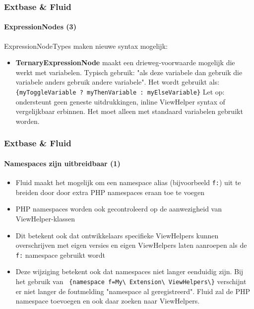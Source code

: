 \begin{frame}[fragile]
	\frametitle{Extbase \& Fluid}
	\framesubtitle{ExpressionNodes (3)}

	ExpressionNodeTypes maken nieuwe syntax mogelijk:

	\begin{itemize}

		\item \textbf{TernaryExpressionNode}\newline
			\small
				maakt een drieweg-voorwaarde mogelijk die werkt met variabelen.
				Typisch gebruik: "als deze variabele dan gebruik die variabele anders gebruik
				andere variabele". Het wordt gebruikt als:\newline
				\texttt{\{myToggleVariable ? myThenVariable : myElseVariable\}}\newline
				Let op: ondersteunt geen geneste uitdrukkingen, inline ViewHelper
				syntax of vergelijkbaar erbinnen. Het moet alleen met standaard variabelen
				gebruikt worden.
			\normalsize

	\end{itemize}

\end{frame}


\begin{frame}[fragile]
	\frametitle{Extbase \& Fluid}
	\framesubtitle{Namespaces zijn uitbreidbaar (1)}

	\begin{itemize}

		\item Fluid maakt het mogelijk om een namespace alias (bijvoorbeeld \texttt{f:}) uit te
			breiden door door extra PHP namespaces eraan toe te voegen

		\item PHP namespaces worden ook gecontroleerd op de aanwezigheid van ViewHelper-klassen

		\item Dit betekent ook dat ontwikkelaars specifieke ViewHelpers kunnen overschrijven
			met eigen versies en eigen ViewHelpers laten aanroepen als de \texttt{f:} namespace
			gebruikt wordt

		\item Deze wijziging betekent ook dat namespaces niet langer eenduidig zijn.\newline
			Bij het gebruik van \texttt{
				\{namespace f=My\textbackslash
				Extension\textbackslash
				ViewHelpers\textbackslash\}}
				verschijnt er niet langer de foutmelding "namespace al geregistreerd".
				Fluid zal de PHP namespace toevoegen en ook daar zoeken naar ViewHelpers.

	\end{itemize}

\end{frame}

